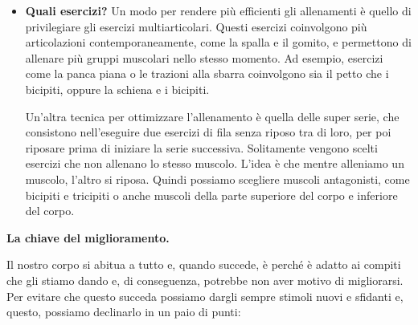 \documentclass[12pt]{book} %
\begin{document}
\begin{itemize}
Alcuni studi hanno evidenziato che l'allenamento di resistenza può diminuire i livelli di ansia e migliorare l'umore generale .
L'attività aerobica stimola la produzione di endorfine, neurotrasmettitori che agiscono come analgesici naturali e migliorano l'umore, oltre ad abbassare i livelli di ormoni dello stress, come il cortisolo, favorendo una sensazione di rilassamento e benessere.
Infine l'attività fisica regolare è correlata a un sonno più profondo e riposante, il che contribuisce al benessere mentale e fisico. 

\item \textbf{Quali esercizi?}
Un modo per rendere più efficienti gli allenamenti è quello di privilegiare gli esercizi multiarticolari. Questi esercizi coinvolgono più articolazioni contemporaneamente, come la spalla e il gomito, e permettono di allenare più gruppi muscolari nello stesso momento. Ad esempio, esercizi come la panca piana o le trazioni alla sbarra coinvolgono sia il petto che i bicipiti, oppure la schiena e i bicipiti.

Un'altra tecnica per ottimizzare l'allenamento è quella delle super serie, che consistono nell'eseguire due esercizi di fila senza riposo tra di loro, per poi riposare prima di iniziare la serie successiva. Solitamente vengono scelti esercizi che non allenano lo stesso muscolo. L'idea è che mentre alleniamo un muscolo, l'altro si riposa. Quindi possiamo scegliere muscoli antagonisti, come bicipiti e tricipiti o anche muscoli della parte superiore del corpo e inferiore del corpo.
\end{itemize}

\textbf{La chiave del miglioramento.}

Il nostro corpo si abitua a tutto e, quando succede, è perché è adatto ai compiti che gli stiamo dando e, di conseguenza, potrebbe non aver motivo di migliorarsi.
Per evitare che questo succeda possiamo dargli sempre stimoli nuovi e sfidanti e, questo, possiamo declinarlo in un paio di punti:
\end{document}

